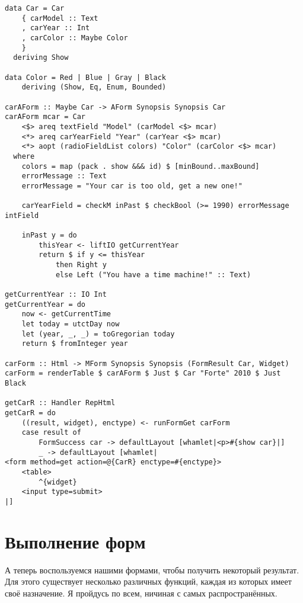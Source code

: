 \begin{lstlisting}[caption={Radio buttons}]
data Car = Car
    { carModel :: Text
    , carYear :: Int
    , carColor :: Maybe Color
    }
  deriving Show

data Color = Red | Blue | Gray | Black
    deriving (Show, Eq, Enum, Bounded)

carAForm :: Maybe Car -> AForm Synopsis Synopsis Car
carAForm mcar = Car
    <$> areq textField "Model" (carModel <$> mcar)
    <*> areq carYearField "Year" (carYear <$> mcar)
    <*> aopt (radioFieldList colors) "Color" (carColor <$> mcar)
  where
    colors = map (pack . show &&& id) $ [minBound..maxBound]
    errorMessage :: Text
    errorMessage = "Your car is too old, get a new one!"

    carYearField = checkM inPast $ checkBool (>= 1990) errorMessage intField

    inPast y = do
        thisYear <- liftIO getCurrentYear
        return $ if y <= thisYear
            then Right y
            else Left ("You have a time machine!" :: Text)

getCurrentYear :: IO Int
getCurrentYear = do
    now <- getCurrentTime
    let today = utctDay now
    let (year, _, _) = toGregorian today
    return $ fromInteger year

carForm :: Html -> MForm Synopsis Synopsis (FormResult Car, Widget)
carForm = renderTable $ carAForm $ Just $ Car "Forte" 2010 $ Just Black

getCarR :: Handler RepHtml
getCarR = do
    ((result, widget), enctype) <- runFormGet carForm
    case result of
        FormSuccess car -> defaultLayout [whamlet|<p>#{show car}|]
        _ -> defaultLayout [whamlet|
<form method=get action=@{CarR} enctype=#{enctype}>
    <table>
        ^{widget}
    <input type=submit>
|]
\end{lstlisting}

\section{Выполнение форм}
А теперь воспользуемся нашими формами, чтобы получить некоторый результат. Для этого
существует несколько различных функций, каждая из которых имеет своё назначение. Я
пройдусь по всем, ничиная с самых распространённых.


